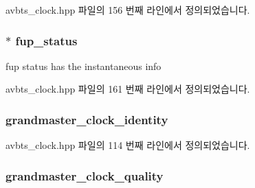 avbts\+\_\+clock.\+hpp 파일의 156 번째 라인에서 정의되었습니다.

\subsubsection[{\texorpdfstring{fup\+\_\+status}{fup_status}}]{$\ast$ fup\+\_\+status\hspace{0.3cm}{\ttfamily [private]}}\hypertarget{class_i_e_e_e1588_clock_aaf00539b688a0556fd64ed67d46baea8}{}\label{class_i_e_e_e1588_clock_aaf00539b688a0556fd64ed67d46baea8}


fup status has the instantaneous info 



avbts\+\_\+clock.\+hpp 파일의 161 번째 라인에서 정의되었습니다.

\subsubsection[{\texorpdfstring{grandmaster\+\_\+clock\+\_\+identity}{grandmaster_clock_identity}}]{ grandmaster\+\_\+clock\+\_\+identity\hspace{0.3cm}{\ttfamily [private]}}\hypertarget{class_i_e_e_e1588_clock_a4cfda330972625c998f486c38a8b1532}{}\label{class_i_e_e_e1588_clock_a4cfda330972625c998f486c38a8b1532}


avbts\+\_\+clock.\+hpp 파일의 114 번째 라인에서 정의되었습니다.

\subsubsection[{\texorpdfstring{grandmaster\+\_\+clock\+\_\+quality}{grandmaster_clock_quality}}]{ grandmaster\+\_\+clock\+\_\+quality\hspace{0.3cm}{\ttfamily [private]}}\hypertarget{class_i_e_e_e1588_clock_a76c6bc5613865d52fb061b609c769bae}{}\label{class_i_e_e_e1588_clock_a76c6bc5613865d52fb061b609c769bae}


